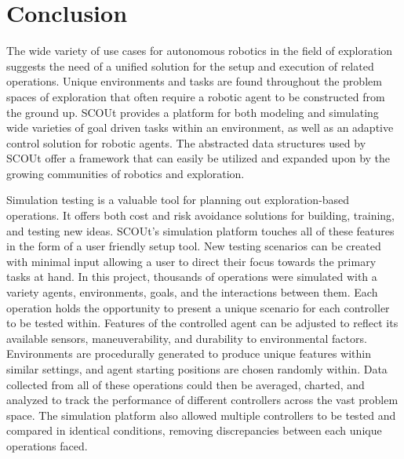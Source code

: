 

\chapter{Conclusion} \label{ch:conclusion}
The wide variety of use cases for autonomous robotics in the field of exploration suggests the need of a unified solution for the setup and execution of related operations.
Unique environments and tasks are found throughout the problem spaces of exploration that often require a robotic agent to be constructed from the ground up.
SCOUt provides a platform for both modeling and simulating wide varieties of goal driven tasks within an environment, as well as an adaptive control solution for robotic agents.
The abstracted data structures used by SCOUt offer a framework that can easily be utilized and expanded upon by the growing communities of robotics and exploration.

Simulation testing is a valuable tool for planning out exploration-based operations.
It offers both cost and risk avoidance solutions for building, training, and testing new ideas.
SCOUt's simulation platform touches all of these features in the form of a user friendly setup tool.
New testing scenarios can be created with minimal input allowing a user to direct their focus towards the primary tasks at hand.
In this project, thousands of operations were simulated with a variety agents, environments, goals, and the interactions between them.
Each operation holds the opportunity to present a unique scenario for each controller to be tested within.
Features of the controlled agent can be adjusted to reflect its available sensors, maneuverability, and durability to environmental factors.
Environments are procedurally generated to produce unique features within similar settings, and agent starting positions are chosen randomly within.
Data collected from all of these operations could then be averaged, charted, and analyzed to track the performance of different controllers across the vast problem space.
The simulation platform also allowed multiple controllers to be tested and compared in identical conditions, removing discrepancies between each unique operations faced.


